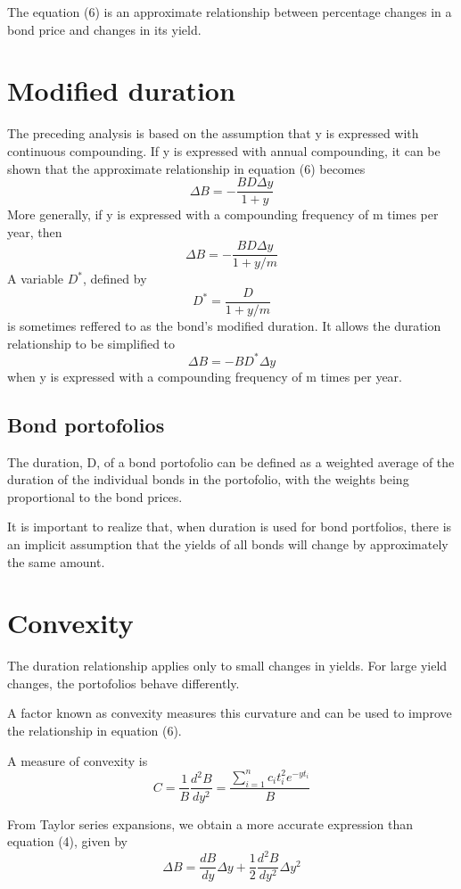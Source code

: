 \documentclass{article}
\begin{document}
The equation (6) is an approximate relationship between percentage changes in a bond price and changes in its yield.

\section{Modified duration}
The preceding analysis is based on the assumption that y is expressed with continuous compounding. If y is expressed with annual compounding, it can be shown that the approximate relationship in equation (6) becomes
\[
\Delta B=-\frac{BD\Delta y}{1+y}
\]
More generally, if y is expressed with a compounding frequency of m times per year, then
\[
\Delta B=-\frac{BD\Delta y}{1+y/m}
\]
A variable $ D^* $, defined by 
\[
D^*=\frac{D}{1+y/m}
\]
is sometimes reffered to as the bond's modified duration. It allows the duration relationship to be simplified to
\begin{equation}
	\Delta B=-BD^*\Delta y
\end{equation}
when y is expressed with a compounding frequency of m times per year.

\subsection{Bond portofolios}
The duration, D, of a bond portofolio can be defined as a weighted average of the duration of the individual bonds in the portofolio, with the weights being proportional to the bond prices.

It is important to realize that, when duration is used for bond portfolios, there is an implicit assumption that the yields of all bonds will change by approximately the same amount.

\section{Convexity}
The duration relationship applies only to small changes in yields.
For large yield changes, the portofolios behave differently.

A factor known as convexity measures this curvature and can be used to improve the relationship in equation (6).

A measure of convexity is 
\[
C=\frac{1}{B}\frac{d^2B}{dy^2}=\frac{\sum_{i=1}^{n}c_it_i^2e^{-yt_i}}{B}
\]

From Taylor series expansions, we obtain a more accurate expression than equation (4), given by
\[
\Delta B=\frac{dB}{dy}\Delta y+\frac{1}{2}\frac{d^2B}{dy^2}\Delta y^2
\]
\end{document}
